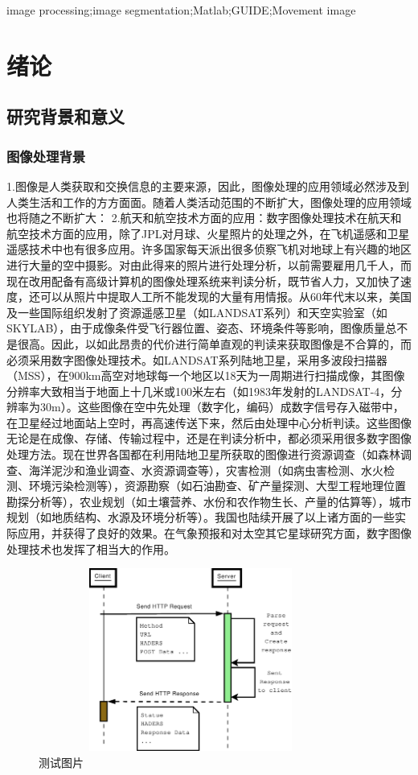 \documentclass[18pt, twoside, a4paper, dvipdfm]{book}
\begin{document}
{\enkeywords image processing;image segmentation;Matlab;GUIDE;Movement image}

\newpage
\tableofcontents

\chapter{绪论}
\section{研究背景和意义}
\subsection{图像处理背景}
1.图像是人类获取和交换信息的主要来源，因此，图像处理的应用领域必然涉及到人类生活和工作的方方面面。随着人类活动范围的不断扩大，图像处理的应用领域也将随之不断扩大：
2.航天和航空技术方面的应用：数字图像处理技术在航天和航空技术方面的应用，除了JPL对月球、火星照片的处理之外，在飞机遥感和卫星遥感技术中也有很多应用。许多国家每天派出很多侦察飞机对地球上有兴趣的地区进行大量的空中摄影。对由此得来的照片进行处理分析，以前需要雇用几千人，而现在改用配备有高级计算机的图像处理系统来判读分析，既节省人力，又加快了速度，还可以从照片中提取人工所不能发现的大量有用情报。从60年代末以来，美国及一些国际组织发射了资源遥感卫星（如LANDSAT系列）和天空实验室（如SKYLAB），由于成像条件受飞行器位置、姿态、环境条件等影响，图像质量总不是很高。因此，以如此昂贵的代价进行简单直观的判读来获取图像是不合算的，而必须采用数字图像处理技术。如LANDSAT系列陆地卫星，采用多波段扫描器（MSS），在900km高空对地球每一个地区以18天为一周期进行扫描成像，其图像分辨率大致相当于地面上十几米或100米左右（如1983年发射的LANDSAT-4，分辨率为30m）。这些图像在空中先处理（数字化，编码）成数字信号存入磁带中，在卫星经过地面站上空时，再高速传送下来，然后由处理中心分析判读。这些图像无论是在成像、存储、传输过程中，还是在判读分析中，都必须采用很多数字图像处理方法。现在世界各国都在利用陆地卫星所获取的图像进行资源调查（如森林调查、海洋泥沙和渔业调查、水资源调查等），灾害检测（如病虫害检测、水火检测、环境污染检测等），资源勘察（如石油勘查、矿产量探测、大型工程地理位置勘探分析等），农业规划（如土壤营养、水份和农作物生长、产量的估算等），城市规划（如地质结构、水源及环境分析等）。我国也陆续开展了以上诸方面的一些实际应用，并获得了良好的效果。在气象预报和对太空其它星球研究方面，数字图像处理技术也发挥了相当大的作用。 

\begin{figure}[htbp]
\centering
\setlength{\abovecaptionskip}{0pt} 
\setlength{\belowcaptionskip}{10pt} 
\caption{测试图片}
\includegraphics[height=6cm, width=10cm]{http.eps}
\end{figure}
\end{document}

